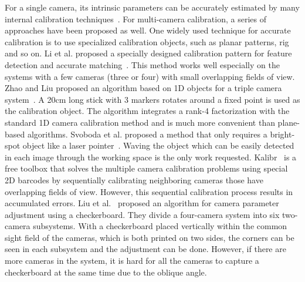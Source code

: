 For a single camera, its intrinsic parameters can be accurately estimated by many internal calibration techniques~\cite{zhang2000flexible,zhang2004camera}.
For multi-camera calibration, a series of approaches have been proposed as well.
One widely used technique for accurate calibration is to use specialized calibration objects, such as planar patterns, rig and so on.
%
Li et al. proposed a specially designed calibration pattern for feature detection and accurate matching~\cite{Li2013A}. %
This method works well especially on the systems with a few cameras (three or four) with small overlapping fields of view.
%
Zhao and Liu proposed an algorithm based on 1D objects for a triple camera system~\cite{zhao2008practical}.
A 20cm long stick with 3 markers rotates around a fixed point is used as the calibration object.
The algorithm integrates a rank-4 factorization with the standard 1D camera calibration method and is much more convenient than plane-based algorithms.
Svoboda et al. proposed a method that only requires a bright-spot object like a laser pointer~\cite{svoboda2005convenient}.
Waving the object which can be easily detected in each image through the working space is the only work requested.
%
Kalibr~\cite{Maye2013Self} is a free toolbox that solves the multiple camera calibration problems using special 2D barcodes by sequentially calibrating neighboring cameras those have overlapping fields of view.
%
However, this sequential calibration process results in accumulated errors.
%
Liu et al.~\cite{Liu2015Algorithm} proposed an algorithm for camera parameter adjustment using a checkerboard. They divide a four-camera system into six two-camera subsystems. With a checkerboard placed vertically within the common sight field of the cameras, which is both printed on two sides, the corners can be seen in each subsystem and the adjustment can be done. However, if there are more cameras in the system, it is hard for all the cameras to capture a checkerboard at the same time due to the oblique angle.


